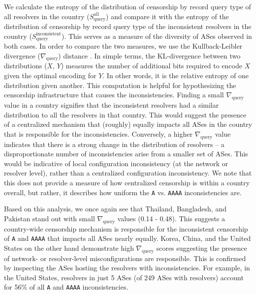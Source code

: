 %
We calculate the entropy of the distribution of censorship by record query type
of all resolvers in the country ($S_{\text{query}}^{\text{all}}$) and compare it
with the entropy of the distribution of censorship by record query type of the
inconsistent resolvers in the country
($S_{\text{query}}^{\text{inconsistent}}$). This serves as a measure of the
diversity of ASes observed in both cases. 
%
In order to compare the two measures, we use the Kullback-Leibler divergence
($\nabla_{\text{query}}$) distance \cite{KLdivergence}. In simple terms, the
KL-divergence between two distributions ($X$, $Y$) measures the number
of additional bits required to encode $X$ given the optimal encoding for $Y$.
In other words, it is the relative entropy of one distribution given another. 
%
This computation is helpful for hypothesizing the censorship infrastructure
that causes the inconsistencies. Finding a small $\nabla_{\text{query}}$ value
in a country signifies that the inconsistent resolvers had a similar
distribution to all the resolvers in that country. This would suggest the
presence of a centralized mechanism that (roughly) equally impacts all ASes in
the country that is responsible for the inconsistencies.
Conversely, a higher $\nabla_{\text{query}}$ value indicates that there is
a strong change in the distribution of resolvers -- \ie a disproportionate
number of inconsistencies arise from a smaller set of ASes. This would be
indicative of local configuration inconsistency (at the network or resolver
level), rather than a centralized configuration inconsistency.
%
We note that this does not provide a measure of how centralized censorship is
within a country overall, but rather, it describes how uniform the {\tt A} vs.
{\tt AAAA} inconsistencies are.

%
Based on this analysis, we once again see that Thailand, Bangladesh, and
Pakistan stand out with small $\nabla_{\text{query}}$ values (0.14 - 0.48).
This suggests a country-wide censorship mechanism is responsible
for the inconsistent censorship of {\tt A} and {\tt AAAA} that impacts all
ASes nearly equally.
%
Korea, China, and the United States on the other hand demonstrate high
$\nabla_{\text{query}}$ scores suggesting the presence of network- or
resolver-level misconfigurations are responsible. This is confirmed by inspecting the ASes
hosting the resolvers with inconsistencies. For example, in the United States,
resolvers in just 5 ASes (of 249 ASes with resolvers) account for 56\% of all
{\tt A} and {\tt AAAA} inconsistencies.


